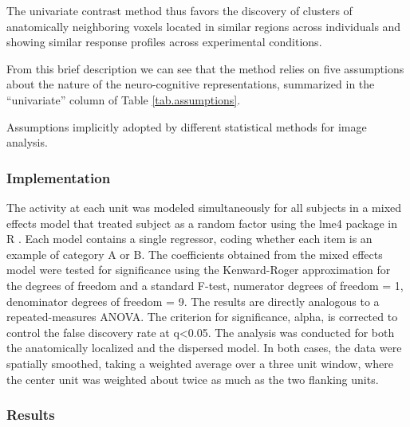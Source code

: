 The univariate contrast method thus favors the discovery of clusters of anatomically neighboring voxels located in similar regions across individuals and showing similar response profiles across experimental conditions. 

From this brief description we can see that the method relies on five assumptions about the nature of the neuro-cognitive representations, summarized in the ``univariate'' column of Table \ref{tab.assumptions}.


\begin{table}
	
	\caption{Assumptions implicitly adopted by different statistical methods for image analysis.}
	\label{tab.assumptions}
\end{table}

\subsubsection{Implementation}
The activity at each unit was modeled simultaneously for all subjects in a mixed effects model that treated subject as a random factor \cite{chen_linear_2013, friston_mixed-effects_2005} using the lme4 package in R \cite{bates_linear_2013}. Each model contains a single regressor, coding whether each item is an example of category A or B. The coefficients obtained from the mixed effects model were tested for significance using the Kenward-Roger approximation for the degrees of freedom \cite{kenward_small_1997} and a standard F-test, numerator degrees of freedom = 1, denominator degrees of freedom = 9. The results are directly analogous to a repeated-measures ANOVA. The criterion for significance, alpha, is corrected to control the false discovery rate at q<0.05. The analysis was conducted for both the anatomically localized and the dispersed model. In both cases, the data were spatially smoothed, taking a weighted average over a three unit window, where the center unit was weighted about twice as much as the two flanking units.

\subsubsection{Results} 


